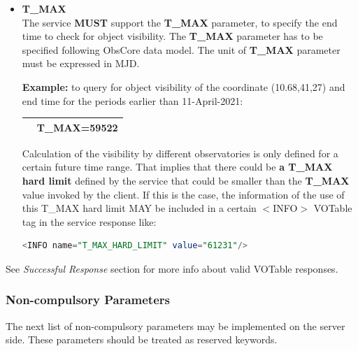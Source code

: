 \documentclass[11pt,a4paper]{ivoa}
\begin{document}
\begin{itemize}
\item{\textbf{T\_MAX}\\The service \textbf{MUST }support the \textbf{T\_MAX }
parameter, to specify the end time to check for object visibility. The
\textbf{T\_MAX} parameter has to be specified following ObsCore data model.
The unit of \textbf{T\_MAX} parameter must be expressed in MJD.\par
\textbf{Example:} to query for object visibility of the coordinate (10.68,41,27) and end
time for the periods earlier than 11-April-2021:
\begin{table}[h]
\centering
\begin{tabular}{|l|l|}
\hline
\begin{lstlisting}[language=SQL]
http://xmmvischeck.esac.esa.int:8080/objvissap/query?
POS=10.68,41.27&T_MAX=59522
\end{lstlisting}
\\
\hline
\end{tabular}
\end{table}

Calculation of the visibility by different observatories is only defined
for a certain future time range. That implies that there could be
\textbf{a T\_MAX hard limit} defined by the service that could be
smaller than the \textbf{T\_MAX} value invoked by the client. If this
is the case, the information of the use of this T\_MAX hard limit MAY be
included in a certain $<$INFO$>$ VOTable tag in the service response
like:
\begin{lstlisting}[language=SQL]
<INFO name="T_MAX_HARD_LIMIT" value="61231"/>
\end{lstlisting}
}
\end{itemize}

See \textit{Successful Response} section for more info about valid
VOTable res\-pon\-ses.

\subsubsection{Non-compulsory Parameters}
The next list of non-compulsory parameters may be implemented on the
server side. These parameters should be treated as reserved keywords.
\end{document}
